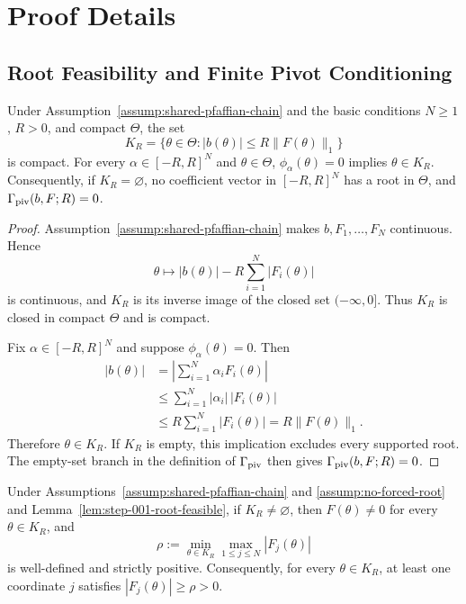 \appendix

\section{Proof Details}\label{sec:proof-details}

\subsection{Root Feasibility and Finite Pivot Conditioning}
\label{app:step-001}

\begin{lemma}
\label{lem:step-001-root-feasible}
Under Assumption~\ref{assump:shared-pfaffian-chain} and the basic conditions
$N\geq1$, $R>0$, and compact $\Theta$, the set
\[
K_R=\{\theta\in\Theta:|b(\theta)|\leq R\|F(\theta)\|_1\}
\]
is compact.  For every $\alpha\in[-R,R]^N$ and $\theta\in\Theta$,
$\phi_\alpha(\theta)=0$ implies $\theta\in K_R$.  Consequently, if
$K_R=\varnothing$, no coefficient vector in $[-R,R]^N$ has a root in
$\Theta$, and $\Gamma_{\rm piv}(b,F;R)=0$.
\end{lemma}

\begin{proof}
Assumption~\ref{assump:shared-pfaffian-chain} makes
$b,F_1,\ldots,F_N$ continuous.  Hence
\[
\theta\longmapsto
|b(\theta)|-R\sum_{i=1}^N|F_i(\theta)|
\]
is continuous, and $K_R$ is its inverse image of the closed set
$(-\infty,0]$.  Thus $K_R$ is closed in compact $\Theta$ and is compact.

Fix $\alpha\in[-R,R]^N$ and suppose $\phi_\alpha(\theta)=0$.  Then
\[
\begin{aligned}
|b(\theta)|
&=\left|\sum_{i=1}^N\alpha_iF_i(\theta)\right|\\
&\leq\sum_{i=1}^N|\alpha_i|\,|F_i(\theta)|\\
&\leq R\sum_{i=1}^N|F_i(\theta)|
=R\|F(\theta)\|_1.
\end{aligned}
\]
Therefore $\theta\in K_R$.  If $K_R$ is empty, this implication excludes
every supported root.  The empty-set branch in the definition of
$\Gamma_{\rm piv}$ then gives $\Gamma_{\rm piv}(b,F;R)=0$.
\end{proof}

\begin{lemma}
\label{lem:step-001-pivot-margin}
Under Assumptions~\ref{assump:shared-pfaffian-chain} and
\ref{assump:no-forced-root} and
Lemma~\ref{lem:step-001-root-feasible}, if $K_R\neq\varnothing$, then
$F(\theta)\neq0$ for every $\theta\in K_R$, and
\[
\rho:=\min_{\theta\in K_R}\max_{1\leq j\leq N}|F_j(\theta)|
\]
is well-defined and strictly positive.  Consequently, for every
$\theta\in K_R$, at least one coordinate $j$ satisfies
$|F_j(\theta)|\geq\rho>0$.
\end{lemma}

